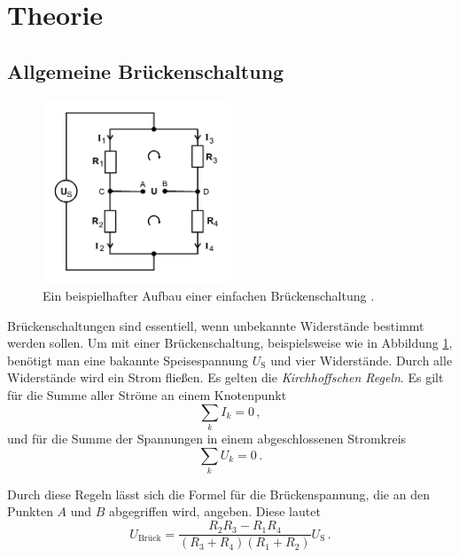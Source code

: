 \section{Theorie}
\label{sec:Theorie}

\subsection{Allgemeine Brückenschaltung}

\begin{figure}
    \centering
    \includegraphics[width=0.5\textwidth]{pictures/schaltung1.pdf}
    \caption{Ein beispielhafter Aufbau einer einfachen Brückenschaltung \cite[1]{v302}.}
    \label{fig:Schaltung1}
\end{figure}

Brückenschaltungen sind essentiell, wenn unbekannte Widerstände bestimmt werden sollen.
Um mit einer Brückenschaltung, beispielsweise wie in Abbildung \ref{fig:Schaltung1},
benötigt man eine bakannte Speisespannung $U_\text{S}$ und vier Widerstände.
Durch alle Widerstände wird ein Strom fließen.
Es gelten die \textit{Kirchhoffschen Regeln}.
Es gilt für die Summe aller Ströme an einem Knotenpunkt
\begin{equation} \label{eq:kirch1}
    \sum_k I_k = 0 \, ,
\end{equation}
und für die Summe der Spannungen in einem abgeschlossenen Stromkreis
\begin{equation} \label{eq:kirch2}
    \sum_k U_k = 0 \, .
\end{equation}

Durch diese Regeln lässt sich die Formel für die Brückenspannung, die an den Punkten $A$ und $B$ abgegriffen wird,
angeben. Diese lautet
\begin{equation}
    U_\text{Brück} = \frac {R_2 R_3 - R_1 R_4} {(R_3 + R_4)(R_1 + R_2)} U_\text{S} \, .
\end{equation}

